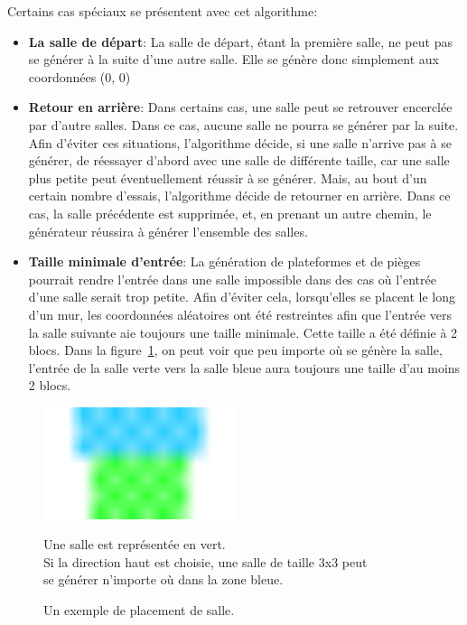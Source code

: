 \documentclass[10pt]{report}
\begin{document}
Certains cas spéciaux se présentent avec cet algorithme:
\begin{itemize}
  \item \textbf{La salle de départ}: La salle de départ, étant la première
  salle, ne peut pas se générer à la suite d'une autre salle.
  Elle se génère donc simplement aux coordonnées (0, 0)
  \item \textbf{Retour en arrière}: Dans certains cas, une salle peut se 
  retrouver encerclée par d'autre salles.
  Dans ce cas, aucune salle ne pourra se générer par la suite.
  Afin d'éviter ces situations, l'algorithme décide, si une salle n'arrive pas à se générer, de réessayer
  d'abord avec une salle de différente taille, car une salle plus petite
  peut éventuellement réussir à se générer.
  Mais, au bout d'un certain nombre d'essais, l'algorithme décide de retourner en arrière.
  Dans ce cas, la salle précédente est supprimée, et, en prenant un autre chemin,
  le générateur réussira à générer l'ensemble des salles.
  \item \textbf{Taille minimale d'entrée}: La génération de plateformes et 
  de pièges pourrait rendre l'entrée dans une salle impossible dans des cas
  où l'entrée d'une salle serait trop petite.
  Afin d'éviter cela, lorsqu'elles se placent le long d'un mur, les coordonnées aléatoires ont
  été restreintes afin que l'entrée vers la salle suivante aie toujours
  une taille minimale.
  Cette taille a été définie à 2 blocs.
  Dans la figure~\ref{fig:room_placement}, on peut voir que peu importe où se génère la
  salle, l'entrée de la salle verte vers la salle bleue aura toujours une
  taille d'au moins 2 blocs.
\end{itemize}

\begin{figure}[H]
  \centering
  \includegraphics[width=0.5\textwidth]{images/room_placement}
  \caption{Un exemple de placement de salle.}
  Une salle est représentée en vert.\\ 
  Si la direction haut est choisie, une salle de taille 3x3 peut\\
  se générer n'importe où dans la zone bleue.
  \label{fig:room_placement}
\end{figure}
\end{document}
